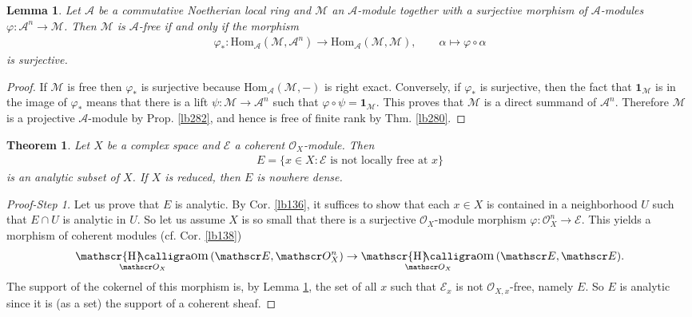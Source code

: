 \documentclass[12pt,b5paper,notitlepage]{report}
\theoremstyle{definition}
\theoremstyle{plain}
\newtheorem{thm}[df]{Theorem}
\newtheorem{lm}[df]{Lemma}
\DeclareMathOperator{\shom}{\mathscr{H}\text{\kern -3pt {\calligra\large om}}\,}
\newcommand{\mc}{\mathcal}
\newcommand{\id}{\mathbf{1}}
\newcommand{\Hom}{\mathrm{Hom}}
\newcommand{\scr}{\mathscr}
\numberwithin{equation}{section}
\begin{document}
\begin{lm}\label{lb137}
Let $\mc A$ be a commutative Noetherian local ring and $\mc M$ an $\mc A$-module together with a surjective morphism of $\mc A$-modules $\varphi:\mc A^n\rightarrow\mc M$. Then $\mc M$ is $\mc A$-free if and only if the morphism
\begin{align*}
\varphi_*:\Hom_{\mc A}(\mc M,\mc A^n)\rightarrow \Hom_{\mc A}(\mc M,\mc M),\qquad \alpha\mapsto \varphi\circ\alpha
\end{align*}
is surjective.
\end{lm}

\begin{proof}
If $\mc M$ is free then $\varphi_*$ is surjective because $\Hom_{\mc A}(\mc M,-)$ is right exact. Conversely, if $\varphi_*$ is surjective, then the fact that $\id_{\mc M}$ is in the image of $\varphi_*$ means that there is a lift $\psi:\mc M\rightarrow\mc A^n$ such that $\varphi\circ\psi=\id_{\mc M}$. This proves that $\mc M$ is a direct summand of $\mc A^n$. Therefore $\mc M$ is a projective $\mc A$-module by Prop. \ref{lb282}, and hence is free of finite rank by Thm. \ref{lb280}.
\end{proof}



\begin{thm}\label{lb168}
Let $X$ be a complex space and $\scr E$ a coherent $\scr O_X$-module. Then
\begin{align*}
E=\{x\in X:\scr E\text{ is not locally free at }x\}
\end{align*}
is an analytic subset of $X$. If $X$ is reduced, then $E$ is nowhere dense.
\end{thm}



\begin{proof}[Proof-Step 1]
Let us prove that $E$ is analytic. By Cor. \ref{lb136}, it suffices to show that each $x\in X$ is contained in a neighborhood $U$ such that $E\cap U$ is analytic in $U$. So let us assume $X$ is so small that there is a surjective $\scr O_X$-module morphism $\varphi:\scr O_X^n\rightarrow\scr E$. This yields a morphism of coherent modules (cf. Cor. \ref{lb138})
\begin{align*}
\shom_{\scr O_X}(\scr E,\scr O_X^n)\rightarrow\shom_{\scr O_X}(\scr E,\scr E).
\end{align*}
The support of the cokernel of this morphism is, by Lemma \ref{lb137}, the set of all $x$ such that $\scr E_x$ is not $\scr O_{X,x}$-free, namely $E$. So $E$ is analytic since it is (as a set) the support of a coherent sheaf.
\end{proof}
\end{document}
